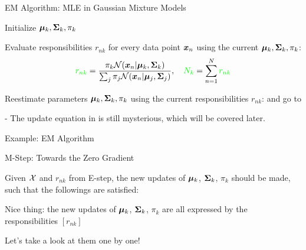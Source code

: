 \documentclass[handout,fleqn,aspectratio=169]{beamer}
\begin{document}
\begin{frame}{EM Algorithm:  MLE in Gaussian Mixture Models}

\small
{}
{
\bce[\red \bf S1.]
\item Initialize $\bm{\mu}_k, \bm{\Sigma}_k, \pi_k$

\item {} Evaluate responsibilities $r_{nk}$ for every data point $\bm{x}_n$ using the current  $\bm{\mu}_k, \bm{\Sigma}_k, \pi_k$:
$$
{\color{green} r_{nk}}=  \frac{\pi_k {\cal N}(\bm{x}_n | \bm{\mu}_k, \bm{\Sigma}_k)}{ \sum_{j}\pi_j {\cal N}(\bm{x}_n | \bm{\mu}_j, \bm{\Sigma}_j) }, \quad {\color{green} N_k} = \sum_{n=1}^N {\color{green} r_{nk}}
$$

\item {} Reestimate parameters $\bm{\mu}_k, \bm{\Sigma}_k, \pi_k$ using the current 
responsibilities $r_{nk}$:
and go to 
\ece
}
\vspace{-0.3cm}
- The update equation in  is still mysterious, which will be covered later.

\end{frame}

\begin{frame}{Example: EM Algorithm}

\end{frame}


\begin{frame}{M-Step: Towards the Zero Gradient}

\plitemsep 0.07in

\bci
\item Given ${\cal X}$ and $r_{nk}$ from E-step, the new updates of $\bm{\mu}_k$, $\bm{\Sigma}_k$, $\pi_k$ should be made, such that the followings are satisfied:

\item Nice thing: the new updates of $\bm{\mu}_k$, $\bm{\Sigma}_k$, $\pi_k$ are all expressed by the responsibilities $[r_{nk}]$ 

\item Let's take a look at them one by one!
\eci
\end{frame}
\end{document}
